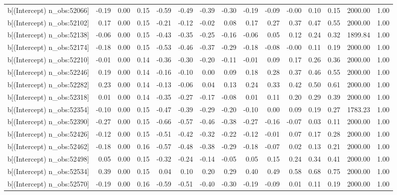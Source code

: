 \begin{table}[ht]
\begin{tabular}{rrrrrrrrrrrrrrr}
  b[(Intercept) n\_obs:52066] & -0.19 & 0.00 & 0.15 & -0.59 & -0.49 & -0.39 & -0.30 & -0.19 & -0.09 & -0.00 & 0.10 & 0.15 & 2000.00 & 1.00 \\ 
  b[(Intercept) n\_obs:52102] & 0.17 & 0.00 & 0.15 & -0.21 & -0.12 & -0.02 & 0.08 & 0.17 & 0.27 & 0.37 & 0.47 & 0.55 & 2000.00 & 1.00 \\ 
  b[(Intercept) n\_obs:52138] & -0.06 & 0.00 & 0.15 & -0.43 & -0.35 & -0.25 & -0.16 & -0.06 & 0.05 & 0.12 & 0.24 & 0.32 & 1899.84 & 1.00 \\ 
  b[(Intercept) n\_obs:52174] & -0.18 & 0.00 & 0.15 & -0.53 & -0.46 & -0.37 & -0.29 & -0.18 & -0.08 & -0.00 & 0.11 & 0.19 & 2000.00 & 1.00 \\ 
  b[(Intercept) n\_obs:52210] & -0.01 & 0.00 & 0.14 & -0.36 & -0.30 & -0.20 & -0.11 & -0.01 & 0.09 & 0.17 & 0.26 & 0.36 & 2000.00 & 1.00 \\ 
  b[(Intercept) n\_obs:52246] & 0.19 & 0.00 & 0.14 & -0.16 & -0.10 & 0.00 & 0.09 & 0.18 & 0.28 & 0.37 & 0.46 & 0.55 & 2000.00 & 1.00 \\ 
  b[(Intercept) n\_obs:52282] & 0.23 & 0.00 & 0.14 & -0.13 & -0.06 & 0.04 & 0.13 & 0.24 & 0.33 & 0.42 & 0.50 & 0.61 & 2000.00 & 1.00 \\ 
  b[(Intercept) n\_obs:52318] & 0.01 & 0.00 & 0.14 & -0.35 & -0.27 & -0.17 & -0.08 & 0.01 & 0.11 & 0.20 & 0.29 & 0.39 & 2000.00 & 1.00 \\ 
  b[(Intercept) n\_obs:52354] & -0.10 & 0.00 & 0.15 & -0.47 & -0.39 & -0.29 & -0.20 & -0.10 & 0.00 & 0.09 & 0.19 & 0.27 & 1783.23 & 1.00 \\ 
  b[(Intercept) n\_obs:52390] & -0.27 & 0.00 & 0.15 & -0.66 & -0.57 & -0.46 & -0.38 & -0.27 & -0.16 & -0.07 & 0.03 & 0.11 & 2000.00 & 1.00 \\ 
  b[(Intercept) n\_obs:52426] & -0.12 & 0.00 & 0.15 & -0.51 & -0.42 & -0.32 & -0.22 & -0.12 & -0.01 & 0.07 & 0.17 & 0.28 & 2000.00 & 1.00 \\ 
  b[(Intercept) n\_obs:52462] & -0.18 & 0.00 & 0.16 & -0.57 & -0.48 & -0.38 & -0.29 & -0.18 & -0.07 & 0.02 & 0.13 & 0.21 & 2000.00 & 1.00 \\ 
  b[(Intercept) n\_obs:52498] & 0.05 & 0.00 & 0.15 & -0.32 & -0.24 & -0.14 & -0.05 & 0.05 & 0.15 & 0.24 & 0.34 & 0.41 & 2000.00 & 1.00 \\ 
  b[(Intercept) n\_obs:52534] & 0.39 & 0.00 & 0.15 & 0.04 & 0.10 & 0.20 & 0.29 & 0.40 & 0.49 & 0.58 & 0.68 & 0.75 & 2000.00 & 1.00 \\ 
  b[(Intercept) n\_obs:52570] & -0.19 & 0.00 & 0.16 & -0.59 & -0.51 & -0.40 & -0.30 & -0.19 & -0.09 & 0.01 & 0.11 & 0.19 & 2000.00 & 1.00 \\ 

\end{tabular}
\end{table}
